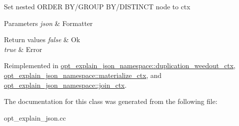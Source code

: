 Set nested O\+R\+D\+ER B\+Y/\+G\+R\+O\+UP B\+Y/\+D\+I\+S\+T\+I\+N\+CT node to {\ttfamily ctx} 


\begin{DoxyParams}{Parameters}
{\em json} & Formatter\\
\hline
\end{DoxyParams}

\begin{DoxyRetVals}{Return values}
{\em false} & Ok \\
\hline
{\em true} & Error \\
\hline
\end{DoxyRetVals}


Reimplemented in \mbox{\hyperlink{classopt__explain__json__namespace_1_1duplication__weedout__ctx_abddc44a12584e636196cbceec61862dd}{opt\+\_\+explain\+\_\+json\+\_\+namespace\+::duplication\+\_\+weedout\+\_\+ctx}}, \mbox{\hyperlink{classopt__explain__json__namespace_1_1materialize__ctx_a88d221b18598fa4bcdb77cafabb8e7be}{opt\+\_\+explain\+\_\+json\+\_\+namespace\+::materialize\+\_\+ctx}}, and \mbox{\hyperlink{classopt__explain__json__namespace_1_1join__ctx_a4da472e6a104b4e13dbc0a39450b4a95}{opt\+\_\+explain\+\_\+json\+\_\+namespace\+::join\+\_\+ctx}}.



The documentation for this class was generated from the following file\+:\begin{DoxyCompactItemize}
\item 
opt\+\_\+explain\+\_\+json.\+cc\end{DoxyCompactItemize}
